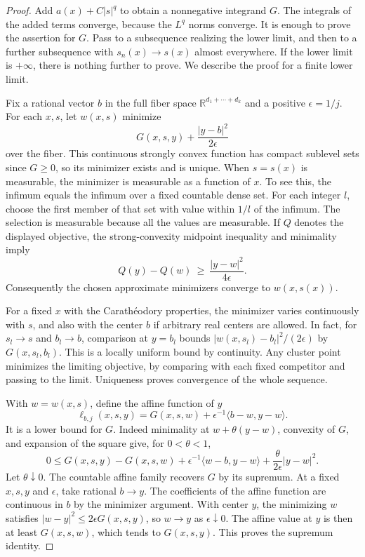 \documentclass[11pt,oneside,openany]{book}
\newcommand{\R}{\mathbb R}
\theoremstyle{plain}
\theoremstyle{definition}
\theoremstyle{remark}
\begin{document}
\begin{proof}
Add \(a(x)+C|s|^q\) to obtain a nonnegative integrand \(G\).
The integrals of the added terms converge, because the \(L^q\)
norms converge. It is enough to prove the assertion for \(G\).
Pass to a subsequence realizing the lower limit, and then to a
further subsequence with \(s_n(x)\to s(x)\) almost everywhere.
If the lower limit is \(+\infty\), there is nothing further to
prove. We describe the proof for a finite lower limit.

Fix a rational vector \(b\) in the full fiber space
\(\R^{d_1+\cdots+d_k}\) and a positive \(\epsilon=1/j\).
For each \(x,s\), let \(w(x,s)\) minimize
\[
 G(x,s,y)+\frac{|y-b|^2}{2\epsilon}
\]
over the fiber. This continuous strongly convex function has
compact sublevel sets since \(G\ge0\), so its minimizer exists
and is unique. When \(s=s(x)\) is measurable, the minimizer is
measurable as a function of \(x\). To see this, the infimum
equals the infimum over a fixed countable dense set. For each
integer \(l\), choose the first member of that set with value
within \(1/l\) of the infimum. The selection is measurable
because all the values are measurable. If \(Q\) denotes the
displayed objective, the strong-convexity midpoint inequality
and minimality imply
\[
 Q(y)-Q(w)\ \ge\ \frac{|y-w|^2}{4\epsilon}.
\]
Consequently the chosen approximate minimizers converge to
\(w(x,s(x))\).

For a fixed \(x\) with the Carath\'eodory properties, the
minimizer varies continuously with \(s\), and also with the
center \(b\) if arbitrary real centers are allowed. In fact,
for \(s_l\to s\) and \(b_l\to b\), comparison at \(y=b_l\)
bounds \(|w(x,s_l)-b_l|^2/(2\epsilon)\) by \(G(x,s_l,b_l)\).
This is a locally uniform bound by continuity. Any cluster
point minimizes the limiting objective, by comparing with each
fixed competitor and passing to the limit. Uniqueness proves
convergence of the whole sequence.

With \(w=w(x,s)\), define the affine function of \(y\)
\[
 \ell_{b,j}(x,s,y)
   =G(x,s,w)+\epsilon^{-1}\langle b-w,y-w\rangle.
\]
It is a lower bound for \(G\). Indeed minimality at
\(w+\theta(y-w)\), convexity of \(G\), and expansion of the
square give, for \(0<\theta<1\),
\[
 0\le G(x,s,y)-G(x,s,w)
       +\epsilon^{-1}\langle w-b,y-w\rangle
       +\frac{\theta}{2\epsilon}|y-w|^2 .
\]
Let \(\theta\downarrow0\). The countable affine family recovers
\(G\) by its supremum. At a fixed \(x,s,y\) and \(\epsilon\),
take rational \(b\to y\). The coefficients of the affine
function are continuous in \(b\) by the minimizer argument.
With center \(y\), the minimizing \(w\) satisfies
\(|w-y|^2\le 2\epsilon G(x,s,y)\), so \(w\to y\) as
\(\epsilon\downarrow0\). The affine value at \(y\) is then at
least \(G(x,s,w)\), which tends to \(G(x,s,y)\). This proves
the supremum identity.


\end{proof}
\end{document}
